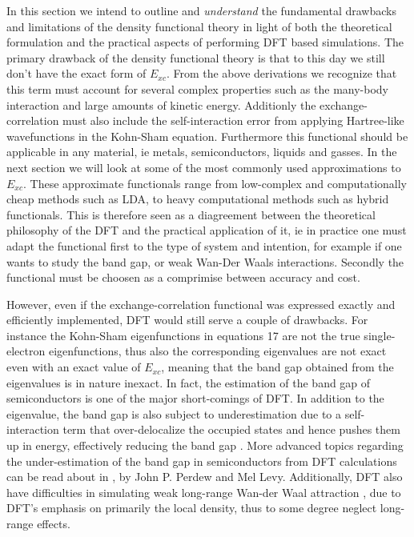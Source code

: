 In this section we intend to outline and \textit{understand} the fundamental drawbacks and limitations of the density functional theory in light of both the theoretical formulation and the practical aspects of performing DFT based simulations. The primary drawback of the density functional theory is that to this day we still don't have the exact form of $E_{xc}$.  From the above derivations we recognize that this term must account for several complex properties such as the many-body interaction and large amounts of kinetic energy. Additionly the exchange-correlation must also include the self-interaction error from applying Hartree-like wavefunctions in the Kohn-Sham equation. Furthermore this functional should be applicable in any material, ie metals, semiconductors, liquids and gasses. In the next section we will look at some of the most commonly used approximations to $E_{xc}$. These approximate functionals range from low-complex and computationally cheap methods such as LDA, to heavy computational methods such as hybrid functionals. This is therefore seen as a diagreement between the theoretical philosophy of the DFT and the practical application of it, ie in practice one must adapt the functional first to the type of system and intention, for example if one wants to study the band gap, or weak Wan-Der Waals interactions. Secondly the functional must be choosen as a comprimise between accuracy and cost.

However, even if the exchange-correlation functional was expressed exactly and efficiently implemented, DFT would still serve a couple of drawbacks. For instance the Kohn-Sham eigenfunctions in equations 17 are not the true single-electron eigenfunctions, thus also the corresponding eigenvalues are not exact even with an exact value of $E_{xc}$, meaning that the band gap obtained from the eigenvalues is in nature inexact. In fact, the estimation of the band gap of semiconductors is one of the major short-comings of DFT. In addition to the eigenvalue, the band gap is also subject to underestimation due to a self-interaction term that over-delocalize the occupied states and hence pushes them up in energy, effectively reducing the band gap \cite{dft_limitations}. More advanced topics regarding the under-estimation of the band gap in semiconductors from DFT calculations can be read about in \cite{dft_bandgap}, by John P. Perdew and Mel Levy. Additionally, DFT also have difficulties in simulating weak long-range Wan-der Waal attraction \cite{dft_wdv}, due to DFT's emphasis on primarily the local density, thus to some degree neglect long-range effects.    

